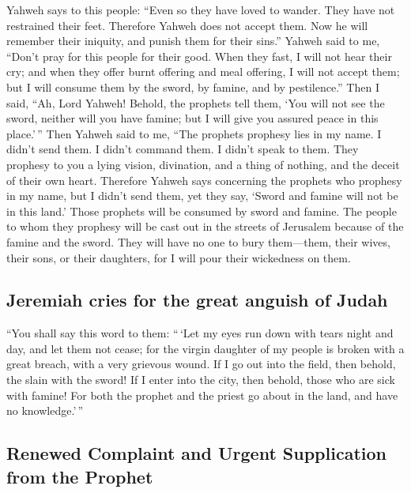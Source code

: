  Yahweh says to this people: ``Even so they have loved to
wander. They have not restrained their feet. Therefore Yahweh does not
accept them. Now he will remember their iniquity, and punish them for
their sins.''  Yahweh said to me, ``Don't pray for this
people for their good.  When they fast, I will not hear
their cry; and when they offer burnt offering and meal offering, I will
not accept them; but I will consume them by the sword, by famine, and by
pestilence.''  Then I said, ``Ah, Lord Yahweh! Behold,
the prophets tell them, `You will not see the sword, neither will you
have famine; but I will give you assured peace in this place.'\,''
 Then Yahweh said to me, ``The prophets prophesy lies in
my name. I didn't send them. I didn't command them. I didn't speak to
them. They prophesy to you a lying vision, divination, and a thing of
nothing, and the deceit of their own heart.  Therefore
Yahweh says concerning the prophets who prophesy in my name, but I
didn't send them, yet they say, `Sword and famine will not be in this
land.' Those prophets will be consumed by sword and famine.
 The people to whom they prophesy will be cast out in the
streets of Jerusalem because of the famine and the sword. They will have
no one to bury them---them, their wives, their sons, or their daughters,
for I will pour their wickedness on them.

\hypertarget{jeremiah-cries-for-the-great-anguish-of-judah}{%
\subsection{Jeremiah cries for the great anguish of
Judah}\label{jeremiah-cries-for-the-great-anguish-of-judah}}

 ``You shall say this word to them: ``\,`Let my eyes run
down with tears night and day, and let them not cease; for the virgin
daughter of my people is broken with a great breach, with a very
grievous wound.  If I go out into the field, then behold,
the slain with the sword! If I enter into the city, then behold, those
who are sick with famine! For both the prophet and the priest go about
in the land, and have no knowledge.'\,''

\hypertarget{renewed-complaint-and-urgent-supplication-from-the-prophet}{%
\subsection{Renewed Complaint and Urgent Supplication from the
Prophet}\label{renewed-complaint-and-urgent-supplication-from-the-prophet}}

